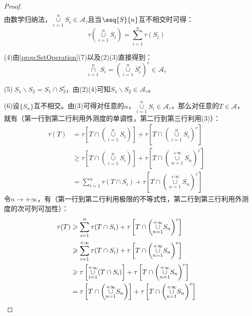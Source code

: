 \begin{proof}
\begin{align*}
	\end{align*}
	由数学归纳法，$\underset{i=1}{\overset{n}{\cup}}S_i\in \mathscr{A}_{\tau}$且当$\seq{S}{n}$互不相交时可得：
	\begin{equation*}
		\tau\left(\underset{i=1}{\overset{n}{\cup}}S_i\right)=\sum_{i=1}^{n}\tau(S_i)
	\end{equation*}\par
	(4)由\cref{prop:SetOperation}(7)以及(2)(3)直接得到：
	\begin{equation*}
		\underset{i=1}{\overset{n}{\cap}}S_i=\left(\underset{i=1}{\overset{n}{\cup}}S_i^c\right)^c\in \mathscr{A}_{\tau}
	\end{equation*}\par
	(5)$\;S_1\backslash S_2=S_1\cap S_2^c$，由(2)(4)可知$S_1\backslash S_2\in \mathscr{A}_{\tau}$。\par
	(6)设$\{S_n\}$互不相交。由(3)可得对任意的$n$，$\underset{i=1}{\overset{n}{\cup}}S_i\in \mathscr{A}_{\tau}$，那么对任意的$T\in \mathscr{A}$，就有（第一行到第二行利用外测度的单调性，第二行到第三行利用(3)）：
	\begin{align*}
		\tau(T)&=\tau\left[T\cap\left(\underset{i=1}{\overset{n}{\cup}}S_i\right)\right]+\tau\left[T\cap\left(\underset{i=1}{\overset{n}{\cup}}S_i\right)^c\right] \\
		&\geqslant \tau\left[T\cap\left(\underset{i=1}{\overset{n}{\cup}}S_i\right)\right]+\tau\left[T\cap\left(\underset{n=1}{\overset{+\infty}{\cup}}S_n\right)^c\right] \\
		&=\sum_{i=1}^n\tau(T\cap S_i)+\tau\left[T\cap\left(\underset{n=1}{\overset{+\infty}{\cup}}S_n\right)^c\right]
	\end{align*}
	令$n\to+\infty$，有（第一行到第二行利用极限的不等式性，第二行到第三行利用外测度的次可列可加性）：
	\begin{align}
		\tau(T)&\geqslant\sum_{i=1}^n\tau(T\cap S_i)+\tau\left[T\cap\left(\underset{n=1}{\overset{+\infty}{\cup}}S_n\right)^c\right]\notag \\
		&\geqslant\sum_{i=1}^{+\infty} \tau(T\cap S_i)+\tau\left[T\cap\left(\underset{n=1}{\overset{+\infty}{\cup}}S_n\right)^c\right] \label{eq:TcupSi}\\
		&\geqslant \tau\left[\underset{i=1}{\overset{+\infty}{\cup}}(T\cap S_i)\right]+\tau\left[T\cap\left(\underset{n=1}{\overset{+\infty}{\cup}}S_n\right)^c\right] \notag \\ &=\tau\left[T\cap\left(\underset{n=1}{\overset{+\infty}{\cup}}S_n\right)\right]+\tau\left[T\cap\left(\underset{n=1}{\overset{+\infty}{\cup}}S_n\right)^c\right]\notag

\end{align}
\end{proof}
